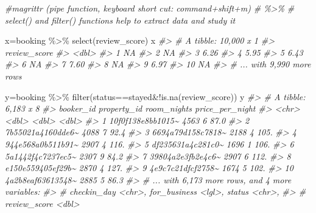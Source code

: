 \documentclass[
]{article}
\newenvironment{Shaded}{\begin{snugshade}}{\end{snugshade}}
\newcommand{\CommentTok}[1]{\textcolor[rgb]{0.56,0.35,0.01}{\textit{#1}}}
\newcommand{\FunctionTok}[1]{\textcolor[rgb]{0.00,0.00,0.00}{#1}}
\newcommand{\NormalTok}[1]{#1}
\newcommand{\OtherTok}[1]{\textcolor[rgb]{0.56,0.35,0.01}{#1}}
\newcommand{\SpecialCharTok}[1]{\textcolor[rgb]{0.00,0.00,0.00}{#1}}
\newcommand{\StringTok}[1]{\textcolor[rgb]{0.31,0.60,0.02}{#1}}
\begin{document}
\begin{Shaded}
\begin{Highlighting}[]
\CommentTok{\#magrittr (pipe function, keyboard short cut: command+shift+m)}
 \CommentTok{\# \%\textgreater{}\% }
\CommentTok{\# select() and filter() functions help to extract data and study it}

\NormalTok{x}\OtherTok{=}\NormalTok{booking }\SpecialCharTok{\%\textgreater{}\%} 
  \FunctionTok{select}\NormalTok{(review\_score)}
\NormalTok{x  }
\CommentTok{\#\textgreater{} \# A tibble: 10,000 x 1}
\CommentTok{\#\textgreater{}    review\_score}
\CommentTok{\#\textgreater{}           \textless{}dbl\textgreater{}}
\CommentTok{\#\textgreater{}  1        NA   }
\CommentTok{\#\textgreater{}  2        NA   }
\CommentTok{\#\textgreater{}  3         6.26}
\CommentTok{\#\textgreater{}  4         5.95}
\CommentTok{\#\textgreater{}  5         6.43}
\CommentTok{\#\textgreater{}  6        NA   }
\CommentTok{\#\textgreater{}  7         7.60}
\CommentTok{\#\textgreater{}  8        NA   }
\CommentTok{\#\textgreater{}  9         6.97}
\CommentTok{\#\textgreater{} 10        NA   }
\CommentTok{\#\textgreater{} \# ... with 9,990 more rows}

\NormalTok{y}\OtherTok{=}\NormalTok{booking }\SpecialCharTok{\%\textgreater{}\%} 
  \FunctionTok{filter}\NormalTok{(status}\SpecialCharTok{==}\StringTok{\textquotesingle{}stayed\textquotesingle{}}\SpecialCharTok{\&!}\FunctionTok{is.na}\NormalTok{(review\_score))}
\NormalTok{y}
\CommentTok{\#\textgreater{} \# A tibble: 6,183 x 8}
\CommentTok{\#\textgreater{}    booker\_id         property\_id room\_nights price\_per\_night}
\CommentTok{\#\textgreater{}    \textless{}chr\textgreater{}                   \textless{}dbl\textgreater{}       \textless{}dbl\textgreater{}           \textless{}dbl\textgreater{}}
\CommentTok{\#\textgreater{}  1 10f0f138e8bb1015\textasciitilde{}        4563           6            87.0}
\CommentTok{\#\textgreater{}  2 7b55021a4160dde6\textasciitilde{}        4088           7            92.4}
\CommentTok{\#\textgreater{}  3 6694a79d158c7818\textasciitilde{}        2188           4           105. }
\CommentTok{\#\textgreater{}  4 944e568a0b511b91\textasciitilde{}        2907           4           116. }
\CommentTok{\#\textgreater{}  5 df235631a4c281c0\textasciitilde{}        1696           1           106. }
\CommentTok{\#\textgreater{}  6 5a1442f4c7237ec5\textasciitilde{}        2307           9            84.2}
\CommentTok{\#\textgreater{}  7 39804a2e3fb2e4c6\textasciitilde{}        2907           6           112. }
\CommentTok{\#\textgreater{}  8 e150e559405ef29b\textasciitilde{}        2870           4           127. }
\CommentTok{\#\textgreater{}  9 4e9c7c21dfcf2758\textasciitilde{}        1674           5           102. }
\CommentTok{\#\textgreater{} 10 4a2b8eaf63613548\textasciitilde{}        2885           5            86.3}
\CommentTok{\#\textgreater{} \# ... with 6,173 more rows, and 4 more variables:}
\CommentTok{\#\textgreater{} \#   checkin\_day \textless{}chr\textgreater{}, for\_business \textless{}lgl\textgreater{}, status \textless{}chr\textgreater{},}
\CommentTok{\#\textgreater{} \#   review\_score \textless{}dbl\textgreater{}}
 

\end{Highlighting}
\end{Shaded}
\end{document}
